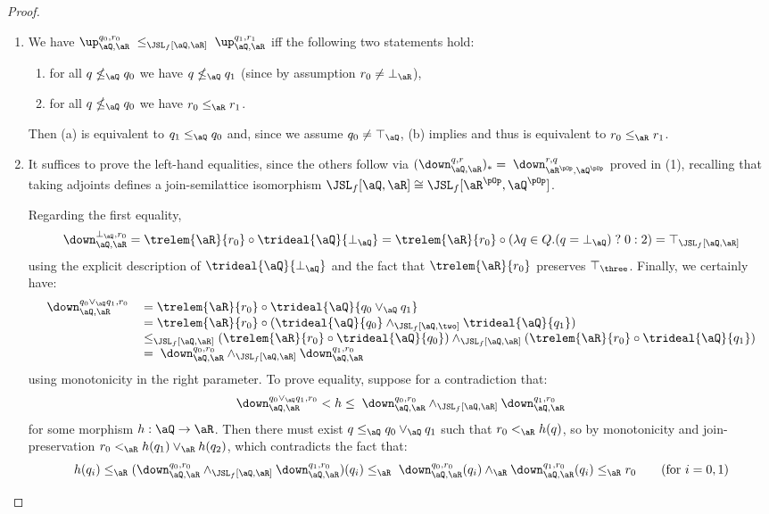 \documentclass{article}
\begin{document}
\begin{proof}
\begin{enumerate}
\item
We have $\up_{\aQ,\aR}^{q_0,r_0} \; \leq_{\JSL_f[\aQ,\aR]} \; \up_{\aQ,\aR}^{q_1,r_1}$ iff the following two statements hold:
\begin{enumerate}
\item
for all $q \nleq_\aQ q_0$ we have $q \nleq_\aQ q_1$ (since by assumption $r_0 \neq \bot_\aR$),
\item
for all $q \nleq_\aQ q_0$ we have $r_0 \leq_\aR r_1$.
\end{enumerate}
Then (a) is equivalent to $q_1 \leq_\aQ q_0$ and, since we assume $q_0 \neq \top_\aQ$, (b) implies and thus is equivalent to $r_0 \leq_\aR r_1$.

\item
It suffices to prove the left-hand equalities, since the others follow via $(\down_{\aQ,\aR}^{q,r})_* = \; \down_{\aR^{\pOp},\aQ^{\pOp}}^{r,q}$ proved in (1), recalling that taking adjoints defines a join-semilattice isomorphism $\JSL_f[\aQ,\aR] \cong \JSL_f[\aR^{\pOp},\aQ^{\pOp}]$.

\smallskip
Regarding the first equality,
\[
\down_{\aQ,\aR}^{\bot_\aQ,r_0}
= \trelem{\aR}{r_0} \circ \trideal{\aQ}{\bot_\aQ}
= \trelem{\aR}{r_0} \circ (\lambda q \in Q. (q = \bot_\aQ) \;?\; 0 : 2)
= \top_{\JSL_f[\aQ,\aR]}
\]
using the explicit description of $\trideal{\aQ}{\bot_\aQ}$ and the fact that $\trelem{\aR}{r_0}$ preserves $\top_\three$. Finally, we certainly have:
\[
\begin{tabular}{lll}
$\down_{\aQ,\aR}^{q_0 \lor_\aQ q_1, r_0}$
&
$= \trelem{\aR}{r_0} \circ \trideal{\aQ}{q_0 \lor_\aQ q_1}$
\\&
$= \trelem{\aR}{r_0} \circ (\trideal{\aQ}{q_0} \land_{\JSL_f[\aQ,\two]} \trideal{\aQ}{q_1})$
\\&
$\leq_{\JSL_f[\aQ,\aR]} (\trelem{\aR}{r_0} \circ \trideal{\aQ}{q_0}) \land_{\JSL_f[\aQ,\aR]} (\trelem{\aR}{r_0} \circ \trideal{\aQ}{q_1}) $
\\&
$= \; \down_{\aQ,\aR}^{q_0,r_0} \land_{\JSL_f[\aQ,\aR]} \down_{\aQ,\aR}^{q_1,r_0}$
\end{tabular}
\]
using monotonicity in the right parameter. To prove equality, suppose for a contradiction that:
\[
\down_{\aQ,\aR}^{q_0 \lor_\aQ q_1, r_0}
< h
\leq 
\; \down_{\aQ,\aR}^{q_0,r_0} \land_{\JSL_f[\aQ,\aR]} \down_{\aQ,\aR}^{q_1,r_0}
\]
for some morphism $h : \aQ \to \aR$. Then there must exist $q \leq_\aQ q_0 \lor_\aQ q_1$ such that $r_0 <_\aR h(q)$, so by monotonicity and join-preservation $r_0 <_\aR h(q_1) \lor_\aR h(q_2)$, which contradicts the fact that:
\[
h(q_i) 
\leq_\aR (\down_{\aQ,\aR}^{q_0,r_0} \land_{\JSL_f[\aQ,\aR]} \down_{\aQ,\aR}^{q_1,r_0})(q_i)
\leq_\aR \; \down_{\aQ,\aR}^{q_0,r_0}(q_i) \land_\aR \down_{\aQ,\aR}^{q_1,r_0}(q_i)
\leq_\aR r_0
\qquad
\text{(for $i = 0,1$)}
\]


\end{enumerate}
\end{proof}
\end{document}
